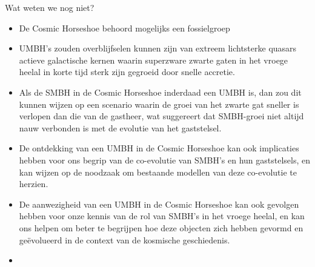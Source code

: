 \documentclass[aspectratio=169,xcolor=dvipsnames]{beamer}
\begin{document}
\begin{frame}{Wat weten we nog niet?}
    \begin{itemize}
        \item De Cosmic Horseshoe behoord mogelijks een fossielgroep
        \item UMBH's zouden overblijfselen kunnen zijn van extreem lichtsterke quasars actieve galactische kernen waarin superzware zwarte gaten in het vroege heelal in korte tijd sterk zijn gegroeid door snelle accretie.
        \item Als de SMBH in de Cosmic Horseshoe inderdaad een UMBH is, dan zou dit kunnen wijzen op een scenario waarin de groei van het zwarte gat sneller is verlopen dan die van de gastheer, wat suggereert dat SMBH-groei niet altijd nauw verbonden is met de evolutie van het gaststelsel.
        \item De ontdekking van een UMBH in de Cosmic Horseshoe kan ook implicaties hebben voor ons begrip van de co-evolutie van SMBH's en hun gaststelsels, en kan wijzen op de noodzaak om bestaande modellen van deze co-evolutie te herzien.
        \item De aanwezigheid van een UMBH in de Cosmic Horseshoe kan ook gevolgen hebben voor onze kennis van de rol van SMBH's in het vroege heelal, en kan ons helpen om beter te begrijpen hoe deze objecten zich hebben gevormd en geëvolueerd in de context van de kosmische geschiedenis.
        \item

    \end{itemize}
\end{frame}
\end{document}
